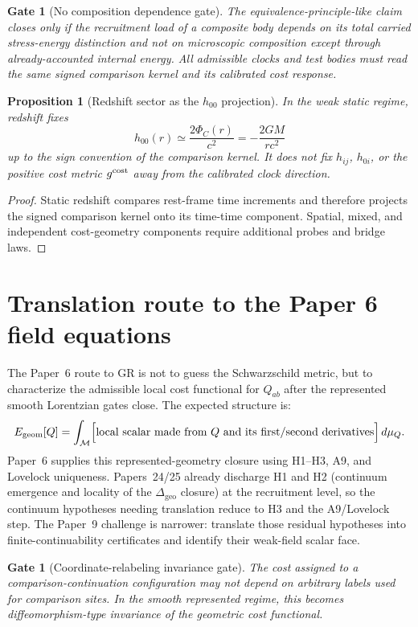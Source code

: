 \documentclass[11pt]{article}
\newtheorem{proposition}[theorem]{Proposition}
\newtheorem{gate}[theorem]{Gate}
\theoremstyle{remark}
\newcommand{\Mgeom}{\mathcal M}
\newcommand{\Egeom}{E_{\rm geom}}
\newcommand{\Gcost}{g^{\rm cost}}
\begin{document}
\begin{gate}[No composition dependence gate]
The equivalence-principle-like claim closes only if the recruitment load of a composite body depends on its total carried stress-energy distinction and not on microscopic composition except through already-accounted internal energy.  All admissible clocks and test bodies must read the same signed comparison kernel and its calibrated cost response.
\end{gate}

\begin{proposition}[Redshift sector as the $h_{00}$ projection]
In the weak static regime, redshift fixes
\[
        h_{00}(r)\simeq\frac{2\Phi_C(r)}{c^2}
        =-\frac{2GM}{rc^2}
\]
up to the sign convention of the comparison kernel.  It does not fix $h_{ij}$, $h_{0i}$, or the positive cost metric $\Gcost$ away from the calibrated clock direction.
\end{proposition}

\begin{proof}
Static redshift compares rest-frame time increments and therefore projects the signed comparison kernel onto its time-time component.  Spatial, mixed, and independent cost-geometry components require additional probes and bridge laws.
\end{proof}

\section{Translation route to the Paper 6 field equations}

The Paper~6 route to GR is not to guess the Schwarzschild metric, but to characterize the admissible local cost functional for \(Q_{ab}\) after the represented smooth Lorentzian gates close.  The expected structure is:
\[
        \Egeom[Q]
        =\int_{\Mgeom} \Bigl[\text{local scalar made from }Q\text{ and its first/second derivatives}\Bigr]\,d\mu_Q.
\]
Paper~6 supplies this represented-geometry closure using H1--H3, A9, and Lovelock uniqueness.  Papers~24/25 already discharge H1 and H2 (continuum emergence and locality of the $\Delta_{\mathrm{geo}}$ closure) at the recruitment level, so the continuum hypotheses needing translation reduce to H3 and the A9/Lovelock step.  The Paper~9 challenge is narrower: translate those residual hypotheses into finite-continuability certificates and identify their weak-field scalar face.

\begin{gate}[Coordinate-relabeling invariance gate]
The cost assigned to a comparison-continuation configuration may not depend on arbitrary labels used for comparison sites.  In the smooth represented regime, this becomes diffeomorphism-type invariance of the geometric cost functional.
\end{gate}
\end{document}
